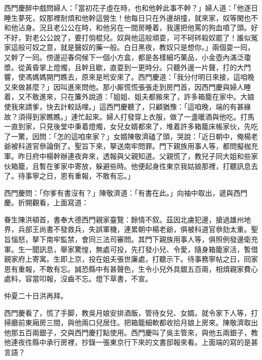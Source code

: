 西門慶醉中戲問婦人：「當初花子虛在時，也和他幹此事不幹？」婦人道：「他逐日睡生夢死，奴那裡耐煩和他幹這營生！他每日只在外邊胡撞，就來家，奴等閑也不和他沾身。況且老公公在時，和他另在一間房睡着，我還把他罵的狗血噴了頭。好不好，對老公公說了，{}要打倘棍兒。奴與他這般頑耍，可不砢硶殺奴罷了！誰似冤家這般可奴之意，就是醫奴的藥一般。白日黑夜，教奴只是想你。」兩個耍一囘，又幹了一囘。傍邊迎春伺候下一個小方盒，都是各樣細巧菓品，小金壺內滿泛瓊漿。從黃昏掌上燈燭，且幹且歇，直耍到一更時分。只聽外邊一片聲，打的大門響，使馮媽媽開門瞧去，原來是玳安來了。西門慶道：「我分付明日來接，這咱晚又來做甚麼？」因叫進來問他。那小厮慌慌張張走到房門首，因西門慶與婦人睡着，又不敢進來，只在簾外說道：「姐姐、姐夫都搬來了，許多箱籠在家中。大娘使我來請爹，快去計較話哩。」這西門慶聽了，只顧猶豫：「這咱晚，端的有甚緣故？須得到家瞧瞧。」連忙起來。婦人打發穿上衣服，做了一盞暖酒與他吃。打馬一直到家，只見後堂中秉着燈燭，女兒女婿都來了，堆着許多箱籠床帳家伙，先吃了一驚，因問：「怎的這咱來家？」女婿陳敬濟磕了頭，哭說：「近日朝中，俺楊老爺被科道官叅論倒了。聖旨下來，拏送南牢問罪。門下親族用事人等，都問擬枷充軍。昨日府中楊幹辦連夜奔來，透報與父親知道。父親慌了，教兒子同大姐和些家伙箱籠，且暫在爹家中寄放，躲避些時。他便起身徃東京我姑娘那裡，打聽訊息去了。待事寧之日，恩有重報，不敢有忘。」

西門慶問：「你爹有書沒有？」陳敬濟道：「有書在此。」向袖中取出，遞與西門慶。折開觀看，上面寫道：

眷生陳洪頓首，書奉大德西門親家臺覽：餘情不叙。茲因北虜犯邊，搶過雄州地界，兵部王尚書不發救兵，失誤軍機，連累朝中楊老爺，{}俱被科道官叅劾太重。聖旨惱怒，拏下南牢監禁，會同三法司審問。其門下親族用事人等，俱照例發邊衛充軍。生一聞訊息，舉家驚惶，無處可投，先打發小兒、令愛，隨身箱籠家活，暫借親家府上寄寓。生即上京，投在姐夫張世廉處，打聽示下。待事務寧帖之日，囘家恩有重報，不敢有忘。誠恐縣中有甚聲色，{}生令小兒外具銀五百兩，相煩親家費心處料，容當叩報，沒齒不忘。燈下草書，不宣。

仲夏二十日洪再拜。

西門慶看了，慌了手脚，教吳月娘安排酒飯，管待女兒、女婿。就令家下人等，打掃廳前東廂房三間，與他兩口兒居住。把箱籠細軟都收拾月娘上房來。{}陳敬濟取出他那五百兩銀子，交與西門慶打點使用。西門慶叫了吳主管來，與他五兩銀子，教他連夜徃縣中承行房裡，抄錄一張東京行下來的文書邸報來看。上面端的寫的是甚言語？

